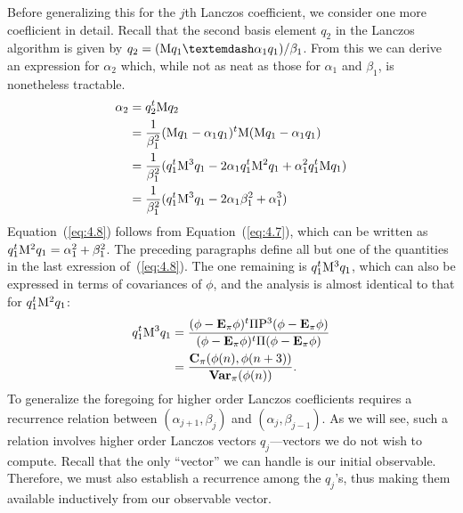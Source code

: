 Before generalizing this for the $j$th Lanczos coefficient, we consider one more coeﬂicient
in detail. Recall that the second basis element $q_2$ in the Lanczos algorithm is given by 
$q_2 = (\M q_1 — \alpha_1 q_1)/\beta_1$. 
From this we can derive an expression for $\alpha_2$ which, while not as neat as those
%
%
%
%
for $\alpha_1$ and $\beta_1$, is nonetheless tractable.
\begin{align}
\label{eq:4.8}
\alpha_2 &= q_2^t \mathrm{M} q_2 \nonumber\\
&= \frac{1}{\beta_1^2}(\mathrm{M} q_1 - \alpha_1 q_1)^t\mathrm{M} (\mathrm{M} q_1 - \alpha_1 q_1)\nonumber\\
&= \frac{1}{\beta_1^2}(q_1^t\mathrm{M}^3 q_1 - 2\alpha_1 q_1^t\mathrm{M}^2 q_1 + \alpha_1^2q_1^t\mathrm{M} q_1 )\nonumber\\
&= \frac{1}{\beta_1^2}(q_1^t\mathrm{M}^3 q_1 - 2\alpha_1 \beta_1^2 + \alpha_1^3 )
\end{align}
Equation~(\ref{eq:4.8}) follows from Equation~(\ref{eq:4.7}), which can be
written as $q_1^t\mathrm{M}^2 q_1 = \alpha_1^2 + \beta_1^2$.  
The preceding paragraphs define all but one of the quantities in the last
exression of~(\ref{eq:4.8}). The one remaining
is $q_1^t\mathrm{M}^3 q_1$, which can also be expressed in terms of covariances of $\phi$,
and the analysis is almost identical to that for $q_1^t\mathrm{M}^2q_1$:
\begin{align*}
q_1^t\mathrm{M}^3 q_1  &= \frac{(\phi - \mathbf{E}_\pi\phi)^t\Pi \mathrm{P}^3(\phi- \mathbf{E}_\pi \phi)}
{(\phi - \mathbf{E}_\pi\phi)^t\Pi (\phi- \mathbf{E}_\pi \phi)} \\
&= \frac{\mathbf{C}_\pi (\phi(n), \phi(n + 3))}{\mathbf{Var}_\pi(\phi(n))}.
\end{align*}
To generalize the foregoing for higher order Lanczos coeﬂicients requires a recurrence
relation between $(\alpha_{j+1}, \beta_j)$ and $(\alpha_{j}, \beta_{j-1})$. 
As we will see, such a relation involves higher order
Lanczos vectors $q_j$---vectors we do not wish to compute. Recall that the only ``vector'' we can
handle is our initial observable. Therefore, we must also establish a recurrence
among the $q_j$'s, thus making them available inductively from our observable vector.

